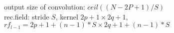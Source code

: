 
output size of convolution: $ceil((N-2P+1)/S)$\\
rec.field: stride $S$, kernel $2p+1\times 2q+1$, $rf_{l-1}=2p+1 + (n-1)*S \times 2q+1 + (n-1)*S$